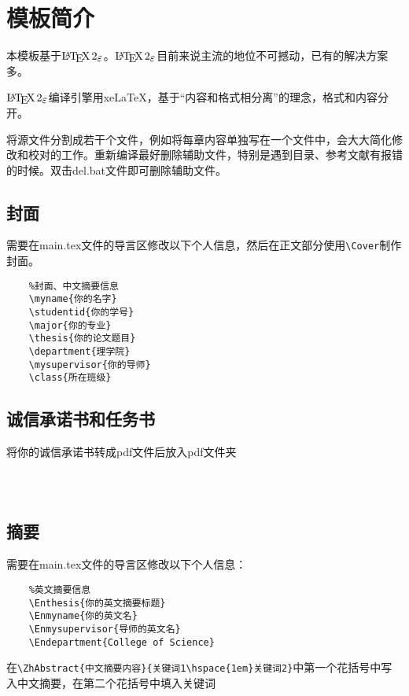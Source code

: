 \section{模板简介}

本模板基于$\LaTeXe$。$\LaTeXe$目前来说主流的地位不可撼动，已有的解决方案多。

$\LaTeXe$编译引擎用xeLaTeX，基于“内容和格式相分离”的理念，格式和内容分开。

将源文件分割成若干个文件，例如将每章内容单独写在一个文件中，会大大简化修改和校对的工作。重新编译最好删除辅助文件，特别是遇到目录、参考文献有报错的时候。双击del.bat文件即可删除辅助文件。




\subsection{封面}

需要在main.tex文件的导言区修改以下个人信息，然后在正文部分使用\verb|\Cover|制作封面。

\begin{lstlisting}
	%封面、中文摘要信息
	\myname{你的名字}
	\studentid{你的学号}
	\major{你的专业}
	\thesis{你的论文题目}
	\department{理学院}
	\mysupervisor{你的导师}
	\class{所在班级}
\end{lstlisting}


\subsection{诚信承诺书和任务书}

将你的诚信承诺书转成pdf文件后放入pdf文件夹

\begin{lstlisting}
	
	
\end{lstlisting}

\subsection{摘要}

需要在main.tex文件的导言区修改以下个人信息：

\begin{lstlisting}
	%英文摘要信息
	\Enthesis{你的英文摘要标题}
	\Enmyname{你的英文名}
	\Enmysupervisor{导师的英文名}
	\Endepartment{College of Science}
\end{lstlisting}

在\verb|\ZhAbstract{中文摘要内容}{关键词1\hspace{1em}关键词2}|中第一个花括号中写入中文摘要，在第二个花括号中填入关键词

